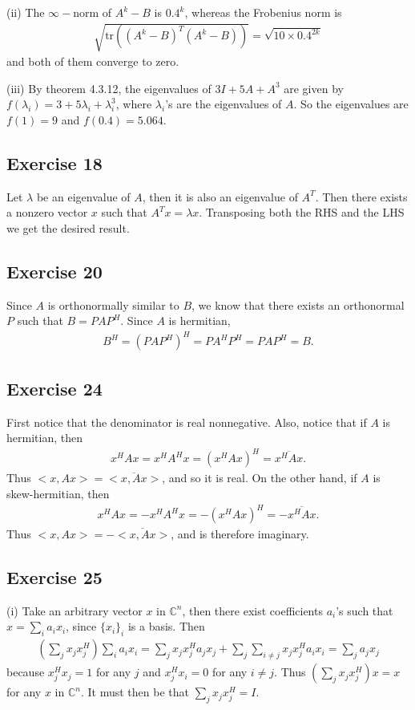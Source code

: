 \documentclass[11.5pt, letterpaper, bibtotoc,
    tablecaptionabove, figurecaptionabove]{article}
\begin{document}
(ii)
The $\infty-$norm of $A^k-B$ is $0.4^k$, whereas the Frobenius norm is
\begin{align*}
    \sqrt{\text{tr}\left(\left(A^k-B\right)^T\left(A^k-B\right)\right)}=
    \sqrt{10\times0.4^{2k}}
\end{align*}
and both of them converge to zero.

(iii)
By theorem 4.3.12, the eigenvalues of $3I+5A+A^3$ are given by
$f(\lambda_i) = 3+5\lambda_i+\lambda_i^3$, where $\lambda_i$'s are the eigenvalues of $A$.
So the eigenvalues are $f(1) = 9$ and $f(0.4)=5.064$.

\subsection*{Exercise 18}
Let $\lambda$ be an eigenvalue of $A$, then it is also an eigenvalue of $A^T$.
Then there exists a nonzero vector $x$ such that $A^Tx=\lambda x$.
Transposing both the RHS and the LHS we get the desired result.

\subsection*{Exercise 20}
Since $A$ is orthonormally similar to $B$, we know that there exists an orthonormal $P$
such that $B = PAP^H$.
Since $A$ is hermitian,
\begin{align*}
    B^H = (PAP^H)^H = PA^HP^H = PAP^H = B.
\end{align*}

\subsection*{Exercise 24}
First notice that the denominator is real nonnegative.
Also, notice that if $A$ is hermitian, then
\begin{align*}
    x^HAx = x^HA^Hx = (x^HAx)^H = \overline{x^HAx}.
\end{align*}
Thus $<x,Ax>=\overline{<x,Ax>}$, and so it is real.
On the other hand, if $A$ is skew-hermitian, then
\begin{align*}
    x^HAx = -x^HA^Hx = -(x^HAx)^H = -\overline{x^HAx}.
\end{align*}
Thus $<x,Ax> = -\overline{<x,Ax>}$, and is therefore imaginary.

\subsection*{Exercise 25}
(i)
Take an arbitrary vector $x$ in $\mathbb C^n$, then there exist coefficients $a_i$'s
such that $x=\sum_ia_ix_i$, since $\{x_i\}_i$ is a basis.
Then
\begin{align*}
    \left(\sum_jx_jx_j^H\right)\sum_ia_ix_i =
    \sum_jx_jx_j^Ha_jx_j + \sum_j\sum_{i\neq j}x_jx_j^Ha_ix_i =
    \sum_ja_jx_j
\end{align*}
because $x_j^Hx_j=1$ for any $j$ and $x_j^Hx_i=0$ for any $i\neq j$.
Thus $(\sum_jx_jx_j^H)x=x$ for any $x$ in $\mathbb C^n$. 
It must then be that $\sum_jx_jx_j^H=I$.
\end{document}
